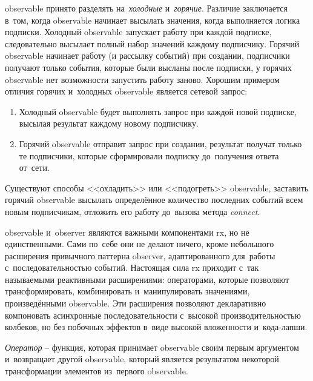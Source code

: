 \gls{observable} принято разделять на~\emph{холодные} и~\emph{горячие}. Различие заключается в~том, когда \gls{observable} начинает высылать значения, когда выполняется логика подписки. Холодный \gls{observable} запускает работу при каждой подписке, следовательно высылает полный набор значений каждому подписчику. Горячий \gls{observable} начинает работу (и рассылку событий) при создании, подписчики получают только события, которые были высланы после подписки, у горячих \gls{observable} нет возможности запустить работу заново. Хорошим примером отличия горячих и~холодных \gls{observable} является сетевой запрос:

\begin{enumerate}
	\item Холодный \gls{observable} будет выполнять запрос при каждой новой подписке, высылая результат каждому новому подписчику.
	\item Горячий \gls{observable} отправит запрос при создании, результат получат только те подписчики, которые сформировали подписку до~получения ответа от~сети.
\end{enumerate}

Существуют способы <<охладить>> или <<подогреть>> \gls{observable}, заставить горячий \gls{observable} высылать определённое количество последних событий всем новым подписчикам, отложить его работу до~вызова метода \textit{connect}.

\gls{observable} и~\gls{observer} являются важными компонентами \gls{rx}, но не единственными. Сами по~себе они не делают ничего, кроме небольшого расширения привычного паттерна \gls{observer}, адаптированного для~работы с~последовательностью событий. Настоящая сила \gls{rx} приходит с~так называемыми реактивными расширениями: операторами, которые позволяют трансформировать, комбинировать и~манипулировать значениями, произведёнными \gls{observable}. Эти расширения позволяют декларативно компоновать асинхронные последовательности с~высокой производительностью колбеков, но без побочных эффектов в~виде высокой вложенности и~кода-лапши.

\emph{Оператор} -- функция, которая принимает \gls{observable} своим первым аргументом и~возвращает другой \gls{observable}, который является результатом некоторой трансформации элементов из~первого \gls{observable}.